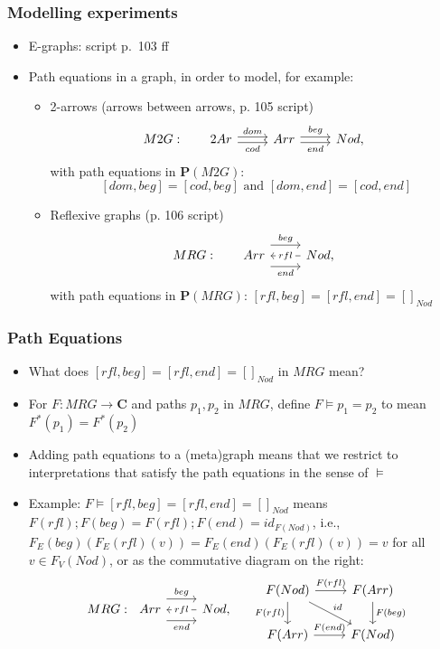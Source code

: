 \documentclass[handout]{beamer}
\newcommand{\bfsf}[1]{{\boldsymbol{#1}}}
\newcommand{\Set}{\bfsf{Set}}
\newcommand{\CC}{\bfsf{C}}
\newcommand{\PP}{\bfsf{P}}
\begin{document}
\frame
  {   
    \frametitle{Modelling experiments}\label{Ch3:Modelling}

 \begin{itemize}[<+->]
\item E-graphs: script p.\ 103 ff
\item Path equations in a graph, in order to model, for example:
   \begin{itemize}[<+->]
\item 2-arrows (arrows between arrows, p. 105 script)
\[M2G:~~~~~ 
\begin{tikzcd}[ampersand replacement=\&]
2Ar \arrow[yshift=0.5ex]{r}{dom} \arrow[swap, yshift=-0.5ex]{r}{cod} \& Arr \arrow[yshift=0.5ex]{r}{beg} \arrow[swap, yshift=-0.5ex]{r}{end} \& Nod,
\end{tikzcd}\]
with path equations in $\PP(M2G)$:
\[
[dom,beg]=[cod,beg] \text{~and~} [dom,end]=[cod,end]
\] 
\item Reflexive graphs (p. 106 script)
 \[MRG:~~~~~
\begin{tikzcd}[ampersand replacement=\&]
Arr \arrow[yshift=2ex]{r}{beg} \arrow[swap, yshift=-2ex]{r}{end}  \& \arrow{l}[description]{rfl} Nod,
\end{tikzcd}\] 
with path equations in $\PP(MRG)$: $[rfl,beg]=[rfl,end]=[]_{Nod}$ 
   \end{itemize}

 \end{itemize}

 }

\frame
  {   
    \frametitle{Path Equations}\label{Ch3:PathEqs}

 \begin{itemize}[<+->]
\item What does $[rfl,beg]=[rfl,end]=[]_{Nod}$ in $MRG$ mean?
\item For $F :MRG\to\CC$ and paths $p_1,p_2$ in $MRG$, define $F\models p_1=p_2$
to mean $F^*(p_1) = F^*(p_2)$
\item Adding path equations to a (meta)graph means that we restrict to interpretations
that satisfy the path equations in the sense of $\models$
\item Example: $F\models [rfl,beg]=[rfl,end]=[]_{Nod}$ %
means $F(rfl);F(beg)=F(rfl);F(end)=id_{F(Nod)}$, i.e., 
$F_E(beg)(F_E(rfl)(v)) = F_E(end)(F_E(rfl)(v)) = v$ for all $v\in F_V(Nod)$,
or as the commutative diagram on the right:
 \[
\begin{tikzcd}[ampersand replacement=\&]
MRG: ~ ~Arr \arrow[yshift=2ex]{r}{beg} \arrow[swap, yshift=-2ex]{r}{end}  \& \arrow{l}[description]{rfl} Nod,
\end{tikzcd}
~~ ~ ~ \begin{tikzcd}[ampersand replacement=\&]
F(Nod) \arrow{r}{F(rfl)}\arrow[swap]{d}{F(rfl)}\arrow{rd}{id}\& F(Arr) \arrow{d}{F(beg)} \\
F(Arr) \arrow{r}{F(end)} \& F(Nod)
\end{tikzcd}
\]

 \end{itemize}

 }
\end{document}

